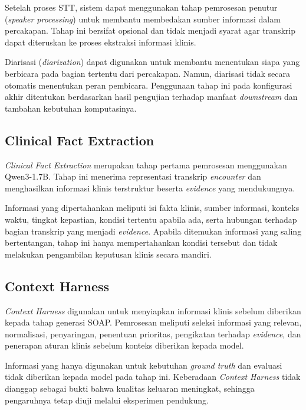 Setelah proses STT, sistem dapat menggunakan tahap pemrosesan penutur (\emph{speaker processing}) untuk membantu membedakan sumber informasi dalam percakapan. Tahap ini bersifat opsional dan tidak menjadi syarat agar transkrip dapat diteruskan ke proses ekstraksi informasi klinis.

Diarisasi (\emph{diarization}) dapat digunakan untuk membantu menentukan siapa yang berbicara pada bagian tertentu dari percakapan. Namun, diarisasi tidak secara otomatis menentukan peran pembicara. Penggunaan tahap ini pada konfigurasi akhir ditentukan berdasarkan hasil pengujian terhadap manfaat \emph{downstream} dan tambahan kebutuhan komputasinya.

\subsection{Clinical Fact Extraction}
\label{subsec:clinicalfact}

\emph{Clinical Fact Extraction} merupakan tahap pertama pemrosesan menggunakan Qwen3-1.7B. Tahap ini menerima representasi transkrip \emph{encounter} dan menghasilkan informasi klinis terstruktur beserta \emph{evidence} yang mendukungnya.

Informasi yang dipertahankan meliputi isi fakta klinis, sumber informasi, konteks waktu, tingkat kepastian, kondisi tertentu apabila ada, serta hubungan terhadap bagian transkrip yang menjadi \emph{evidence}. Apabila ditemukan informasi yang saling bertentangan, tahap ini hanya mempertahankan kondisi tersebut dan tidak melakukan pengambilan keputusan klinis secara mandiri.

\subsection{Context Harness}
\label{subsec:contextharness}

\emph{Context Harness} digunakan untuk menyiapkan informasi klinis sebelum diberikan kepada tahap generasi SOAP. Pemrosesan meliputi seleksi informasi yang relevan, normalisasi, penyaringan, penentuan prioritas, pengikatan terhadap \emph{evidence}, dan penerapan aturan klinis sebelum konteks diberikan kepada model.

Informasi yang hanya digunakan untuk kebutuhan \emph{ground truth} dan evaluasi tidak diberikan kepada model pada tahap ini. Keberadaan \emph{Context Harness} tidak dianggap sebagai bukti bahwa kualitas keluaran meningkat, sehingga pengaruhnya tetap diuji melalui eksperimen pendukung.

